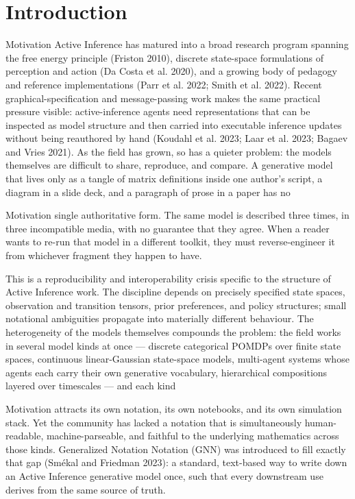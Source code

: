 \documentclass[
  ignorenonframetext,
]{beamer}
\author{\texorpdfstring{}{}}
\date{}
\begin{document}
\section{Introduction}\label{sec:introduction}

\begin{frame}[allowframebreaks]{Motivation}
\protect{}\label{motivation}
Active Inference has matured into a broad research program spanning the
free energy principle (Friston 2010), discrete state-space formulations
of perception and action (Da Costa et al. 2020), and a growing body of
pedagogy and reference implementations (Parr et al. 2022; Smith et al.
2022). Recent graphical-specification and message-passing work makes the
same practical pressure visible: active-inference agents need
representations that can be inspected as model structure and then
carried into executable inference updates without being reauthored by
hand (Koudahl et al. 2023; Laar et al. 2023; Bagaev and Vries 2021). As
the field has grown, so has a quieter problem: the models themselves are
difficult to share, reproduce, and compare. A generative model that
lives only as a tangle of matrix definitions inside one author's script,
a diagram in a slide deck, and a paragraph of prose in a paper has no
\end{frame}

\begin{frame}[allowframebreaks]{Motivation}
single authoritative form. The same model is described three times, in
three incompatible media, with no guarantee that they agree. When a
reader wants to re-run that model in a different toolkit, they must
reverse-engineer it from whichever fragment they happen to have.

This is a reproducibility and interoperability crisis specific to the
structure of Active Inference work. The discipline depends on precisely
specified state spaces, observation and transition tensors, prior
preferences, and policy structures; small notational ambiguities
propagate into materially different behaviour. The heterogeneity of the
models themselves compounds the problem: the field works in several
model kinds at once --- discrete categorical POMDPs over finite state
spaces, continuous linear-Gaussian state-space models, multi-agent
systems whose agents each carry their own generative vocabulary,
hierarchical compositions layered over timescales --- and each kind
\end{frame}

\begin{frame}[allowframebreaks]{Motivation}
attracts its own notation, its own notebooks, and its own simulation
stack. Yet the community has lacked a notation that is simultaneously
human-readable, machine-parseable, and faithful to the underlying
mathematics across those kinds. Generalized Notation Notation (GNN) was
introduced to fill exactly that gap (Smékal and Friedman 2023): a
standard, text-based way to write down an Active Inference generative
model once, such that every downstream use derives from the same source
of truth.
\end{frame}
\end{document}
